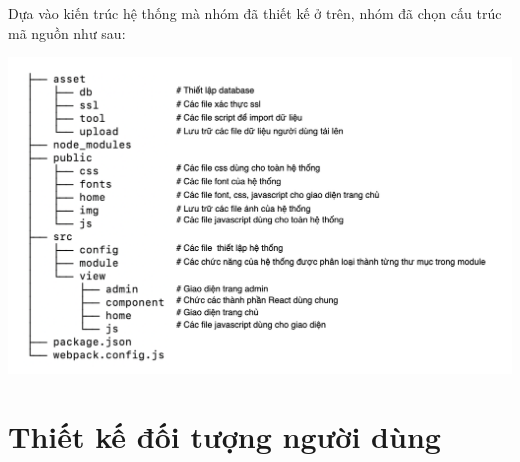 Dựa vào kiến trúc hệ thống mà nhóm đã thiết kế ở trên, nhóm đã chọn cấu trúc mã nguồn như sau:
\begin{center}
  \captionsetup{type=figure}
  \includegraphics[width=15cm]{img/tree.png}
\end{center}
\section{Thiết kế đối tượng người dùng}
